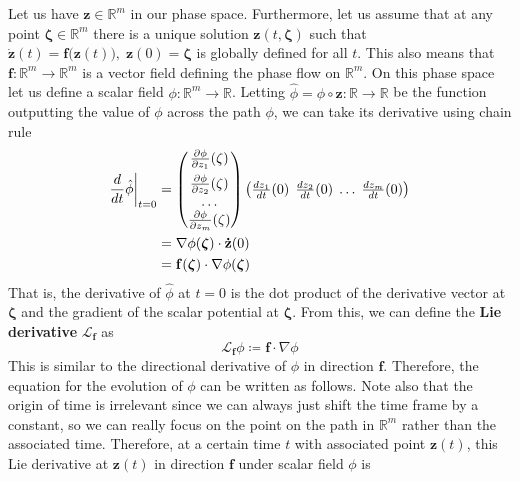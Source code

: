 \documentclass{article}
\begin{document}
      Let us have $\mathbf{z} \in \mathbb{R}^m$ in our phase space. Furthermore, let us assume that at any point $\boldsymbol{\zeta} \in \mathbb{R}^m$ there is a unique solution $\mathbf{z}(t, \boldsymbol{\zeta})$ such that $\mathbf{\dot{z}}(t) = \mathbf{f}\big(\mathbf{z}(t)\big), \; \mathbf{z}(0) = \boldsymbol{\zeta}$ is globally defined for all $t$. This also means that $\mathbf{f}: \mathbb{R}^m \longrightarrow \mathbb{R}^m$ is a vector field defining the phase flow on $\mathbb{R}^m$. On this phase space let us define a scalar field $\phi: \mathbb{R}^m \longrightarrow \mathbb{R}$. Letting $\hat{\phi} = \phi \circ \mathbf{z}: \mathbb{R} \longrightarrow \mathbb{R}$ be the function outputting the value of $\phi$ across the path $\phi$, we can take its derivative using chain rule
      \begin{align*}
        \frac{d}{dt} \hat{\phi} \bigg|_{t=0} & = \begin{pmatrix}
        \frac{\partial \phi}{\partial z_1} (\zeta) \\[0.5em]
        \frac{\partial \phi}{\partial z_2} (\zeta) \\
        \ldots \\ 
        \frac{\partial \phi}{\partial z_m} (\zeta) \end{pmatrix} 
        \begin{pmatrix}
        \frac{d z_1}{dt} (0) &\hspace{-2mm} \frac{d z_2}{dt} (0) &\hspace{-2mm} \ldots &\hspace{-2mm} \frac{d z_m}{dt} (0) \end{pmatrix} \\
        & = \nabla \phi(\boldsymbol{\zeta}) \cdot \mathbf{\dot{z}} (0) \\ 
        & = \mathbf{f}(\boldsymbol{\zeta}) \cdot \nabla \phi(\boldsymbol{\zeta}) 
      \end{align*}
      That is, the derivative of $\hat{\phi}$ at $t = 0$ is the dot product of the derivative vector at $\boldsymbol{\zeta}$ and the gradient of the scalar potential at $\boldsymbol{\zeta}$. From this, we can define the \textbf{Lie derivative} $\mathcal{L}_\mathbf{f}$ as 
      \begin{equation}
        \mathcal{L}_\mathbf{f} \phi \coloneqq \mathbf{f} \cdot \nabla \phi
      \end{equation}
      This is similar to the directional derivative of $\phi$ in direction $\mathbf{f}$. Therefore, the equation for the evolution of $\phi$ can be written as follows. Note also that the origin of time is irrelevant since we can always just shift the time frame by a constant, so we can really focus on the point on the path in $\mathbb{R}^m$ rather than the associated time. Therefore, at a certain time $t$ with associated point $\mathbf{z}(t)$, this Lie derivative at $\mathbf{z}(t)$ in direction $\mathbf{f}$ under scalar field $\phi$ is 
\end{document}
